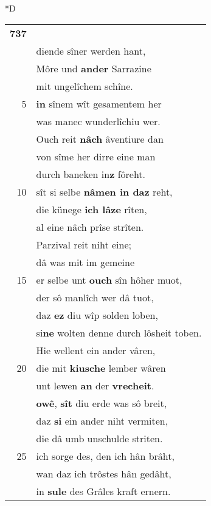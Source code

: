 \documentclass[8pt,a4paper,notitlepage]{article}
\begin{document}
\begin{table}[ht]
\begin{minipage}[t]{0.5\linewidth}
\small
\begin{center}*D
\end{center}
\begin{tabular}{rl}
\textbf{737} & \textbf{\begin{large}A\end{large}lsus} manec sunder lant\\ 
 & diende sîner werden hant,\\ 
 & Môre und \textbf{ander} Sarrazine\\ 
 & mit ungelîchem schîne.\\ 
5 & \textbf{in} sînem wît gesamentem her\\ 
 & was manec wunderlîchiu wer.\\ 
 & Ouch reit \textbf{nâch} âventiure dan\\ 
 & von sîme her dirre eine man\\ 
 & durch baneken in\textbf{z} fôreht.\\ 
10 & sît si selbe \textbf{nâmen in daz} reht,\\ 
 & die künege \textbf{ich lâze} rîten,\\ 
 & al eine nâch prîse strîten.\\ 
 & Parzival reit niht eine;\\ 
 & dâ was mit im gemeine\\ 
15 & er selbe unt \textbf{ouch} sîn hôher muot,\\ 
 & der sô manlîch wer dâ tuot,\\ 
 & daz \textbf{ez} diu wîp solden loben,\\ 
 & si\textbf{ne} wolten denne durch lôsheit toben.\\ 
 & Hie wellent ein ander vâren,\\ 
20 & die mit \textbf{kiusche} lember wâren\\ 
 & unt lewen \textbf{an} der \textbf{vrecheit}.\\ 
 & \textbf{owê}, \textbf{sît} diu erde was sô breit,\\ 
 & daz \textbf{si} ein ander niht vermiten,\\ 
 & die dâ umb unschulde striten.\\ 
25 & ich sorge des, den ich hân brâht,\\ 
 & wan daz ich trôstes hân gedâht,\\ 
 & in \textbf{sule} des Grâles kraft ernern.\\ 

\end{tabular}
\end{minipage}
\end{table}
\end{document}
